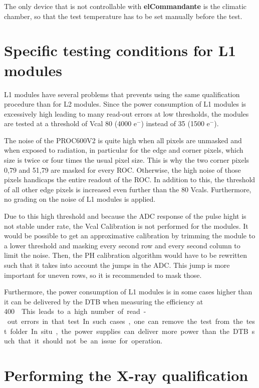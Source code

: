 \documentclass[a4paper,12pt,twoside]{article}
\begin{document}
The only device that is not controllable with \textbf{elCommandante} is the climatic chamber, so that the test temperature has to be set manually before the test.


\section{Specific testing conditions for L1 modules}

L1 modules have several problems that prevents using the same qualification procedure than for L2 modules. Since the power consumption of L1 modules is excessively high leading to many read-out errors at low thresholds, the modules are tested at a threshold of Vcal 80 (4000 e$^-$) instead of 35 (1500 e$^-$). 

The noise of the PROC600V2 is quite high when all pixels are unmasked and when exposed to radiation, in particular for the edge and corner pixels, which size is twice or four times the usual pixel size. This is why the two corner pixels 0,79 and 51,79 are masked for every ROC. Otherwise, the high noise of those pixels handicaps the entire readout of the ROC. In addition to this, the threshold of all other edge pixels is increased even further than the 80 Vcals. Furthermore, no grading on the noise of L1 modules is applied.

Due to this high threshold and because the ADC response of the pulse hight is not stable under rate, the Vcal Calibration is not performed for the modules. 
It would be possible to get an approximative calibration by trimming the module to a lower threshold and masking every second row and every second column to limit the noise. Then, the PH calibration algorithm would have to be rewritten such that it takes into account the jumps in the ADC. This jump is more important for uneven rows, so it is recommended to mask those.

Furthermore, the power consumption of L1 modules is in some cases higher than it can be delivered by the DTB when measuring the efficiency at \SI{400}{\mega\hertz\per\centi\meter\square}. This leads to a high number of read-out errors in that test. In such cases, one can remove the test from the test folder. In situ, the power supplies can deliver more power than the DTB such that it should not be an issue for operation. 


\section{Performing the X-ray qualification}
\end{document}
